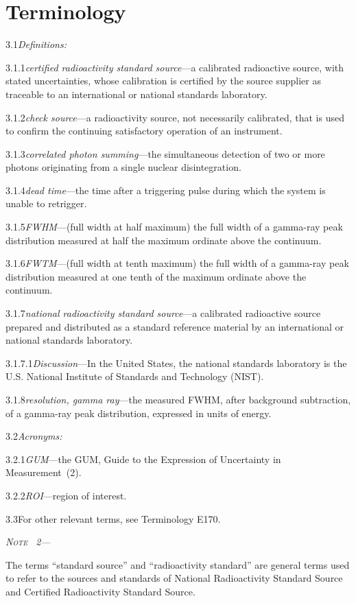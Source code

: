 \documentclass[12pt]{article}
\newenvironment{astmnote}[1][\relax]{%
  \par\smallskip\noindent\textit{N\textsc{ote}%
  \ifx#1\relax\else~#1\fi---}\ignorespaces
}{%
  \par\smallskip
}
\begin{document}
\section{Terminology}

3.1\quad \textit{Definitions:}

3.1.1\quad \textit{certified radioactivity standard source}---a calibrated radioactive
source, with stated uncertainties, whose calibration is certified by the source supplier
as traceable to an international or national standards laboratory.

3.1.2\quad \textit{check source}---a radioactivity source, not necessarily calibrated,
that is used to confirm the continuing satisfactory operation of an instrument.

3.1.3\quad \textit{correlated photon summing}---the simultaneous detection of two or more
photons originating from a single nuclear disintegration.

3.1.4\quad \textit{dead time}---the time after a triggering pulse during which the system
is unable to retrigger.

3.1.5\quad \textit{FWHM}---(full width at half maximum) the full width of a gamma-ray
peak distribution measured at half the maximum ordinate above the continuum.

3.1.6\quad \textit{FWTM}---(full width at tenth maximum) the full width of a gamma-ray
peak distribution measured at one tenth of the maximum ordinate above the continuum.

3.1.7\quad \textit{national radioactivity standard source}---a calibrated radioactive
source prepared and distributed as a standard reference material by an international or
national standards laboratory.

3.1.7.1\quad \textit{Discussion}---In the United States, the national standards laboratory
is the U.S. National Institute of Standards and Technology (NIST).

3.1.8\quad \textit{resolution, gamma ray}---the measured FWHM, after background
subtraction, of a gamma-ray peak distribution, expressed in units of energy.

3.2\quad \textit{Acronyms:}

3.2.1\quad \textit{GUM}---the GUM, Guide to the Expression of Uncertainty in
Measurement~(2).

3.2.2\quad \textit{ROI}---region of interest.

3.3\quad For other relevant terms, see Terminology E170.

\begin{astmnote}[2]
The terms ``standard source'' and ``radioactivity standard'' are general terms used to
refer to the sources and standards of National Radioactivity Standard Source and Certified
Radioactivity Standard Source.
\end{astmnote}
\end{document}
